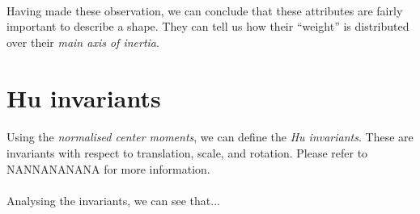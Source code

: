 \paragraph{}
Having made these observation, we can conclude that these attributes are fairly important to describe a shape. They can tell us how their ``weight'' is distributed over their \emph{main axis of inertia}.

\clearpage

\section{Hu invariants}
\paragraph{}
Using the \emph{normalised center moments}, we can define the \emph{Hu invariants}. These are invariants with respect to translation, scale, and rotation.
Please refer to NANNANANANA for more information.
\paragraph{}
Analysing the invariants, we can see that...